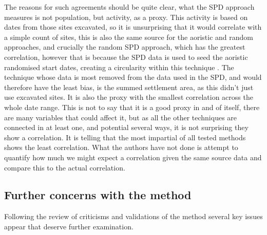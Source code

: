 The reasons for such agreements should be quite clear, what the SPD approach measures is not population, but activity, as a proxy. This activity is based on dates from those sites excavated, so it is unsurprising that it would correlate with a simple count of sites, this is also the same source for the aoristic and random approaches, and crucially the random SPD approach, which has the greatest correlation, however that is because the SPD data is used to seed the aoristic randomised start dates, creating a circularity within this technique \citep[63]{PALMISANO201759}. The technique whose data is most removed from the data used in the SPD, and would therefore have the least bias, is the summed settlement area, as this didn't just use excavated sites. It is also the proxy with the smallest correlation across the whole date range. This is not to say that it is a good proxy in and of itself, there are many variables that could affect it, but as all the other techniques are connected in at least one, and potential several ways, it is not surprising they show a correlation. It is telling that the most impartial of all tested methods shows the least correlation. What the authors have not done is attempt to quantify how much we might expect a correlation given the same source data and compare this to the actual correlation.  

\subsection{Further concerns with the method}
Following the review of criticisms and validations of the method several key issues appear that deserve further examination.


